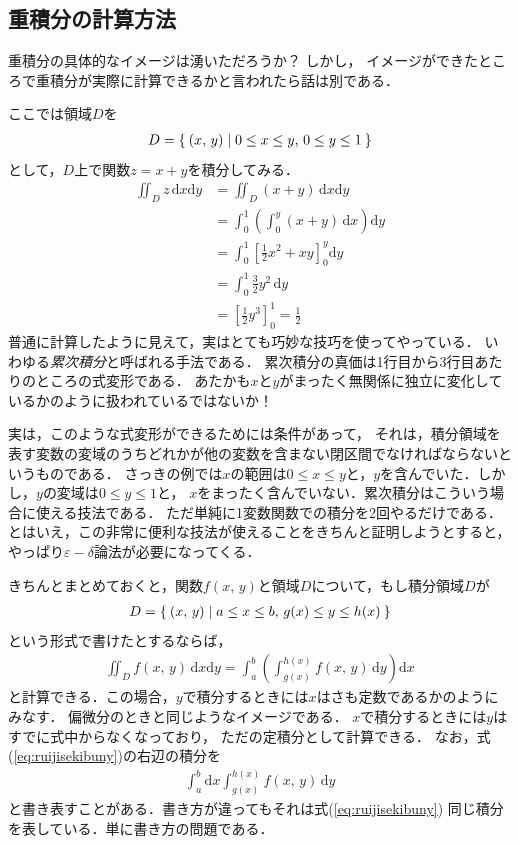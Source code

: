 \subsection{重積分の計算方法}
重積分の具体的なイメージは湧いただろうか？ しかし，
イメージができたところで重積分が実際に計算できるかと言われたら話は別である．

ここでは領域$D$を
\begin{align*}
D= \Set{ (x, \, y) | 0 \leq x \leq y , \, 0 \leq y \leq 1}
\end{align*}
として，$D$上で関数$z = x + y$を積分してみる．
\begin{align*}
\iint_{D} z \, \mathrm{d}x \mathrm{d}y & = \iint_{D} (x+y) \, \mathrm{d}x \mathrm{d}y \\
& = \int_0^1 \left( \int_0^y (x+y) \, \mathrm{d}x \right) \mathrm{d}y \\
& = \int_0^1 \left[ \frac{1}{2} x^2 + xy \right]_0^y \mathrm{d}y \\
& = \int_0^1 \frac{3}{2} y^2 \, \mathrm{d}y \\
& = \left[ \frac{1}{2} y^3 \right]_0^1 = \frac{1}{2}
\end{align*}
普通に計算したように見えて，実はとても巧妙な技巧を使ってやっている．
いわゆる\emph{累次積分}と呼ばれる手法である．
累次積分の真価は1行目から3行目あたりのところの式変形である．
あたかも$x$と$y$がまったく無関係に独立に変化しているかのように扱われているではないか！

実は，このような式変形ができるためには条件があって，
それは，積分領域を表す変数の変域のうちどれかが他の変数を含まない閉区間でなければならないというものである．
さっきの例では$x$の範囲は$0 \leq x \leq y$と，$y$を含んでいた．しかし，$y$の変域は$0 \leq y \leq 1$と，
$x$をまったく含んでいない．累次積分はこういう場合に使える技法である．
ただ単純に1変数関数での積分を2回やるだけである．
とはいえ，この非常に便利な技法が使えることをきちんと証明しようとすると，
やっぱり$\varepsilon - \delta$論法が必要になってくる．

きちんとまとめておくと，関数$f(x, \, y)$と領域$D$について，もし積分領域$D$が
\begin{align*}
D = \Set{ (x, \, y) | a \leq x \leq b , \, g(x) \leq y \leq h(x) }
\end{align*}
という形式で書けたとするならば，
\begin{align}
\iint_D f(x, \, y) \, \mathrm{d} x \mathrm{d} y
= \int_a^b \left( \int_{g(x)}^{h(x)} f(x, \, y) \, \mathrm{d} y \right) \mathrm{d}x 
\label{eq:ruijisekibuny}
\end{align}
と計算できる．この場合，$y$で積分するときには$x$はさも定数であるかのようにみなす．
偏微分のときと同じようなイメージである．
$x$で積分するときには$y$はすでに式中からなくなっており，
ただの定積分として計算できる．
なお，式(\ref{eq:ruijisekibuny})の右辺の積分を
\begin{align*}
\int_a^b \mathrm{d}x  \int_{g(x)}^{h(x)} f(x, \, y) \, \mathrm{d} y 
\end{align*}
と書き表すことがある．書き方が違ってもそれは式(\ref{eq:ruijisekibuny})
同じ積分を表している．単に書き方の問題である．

